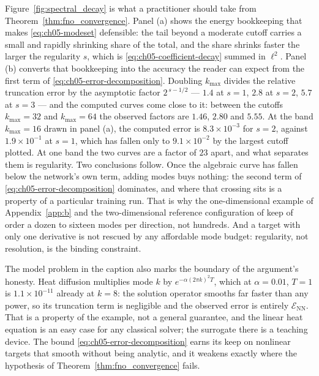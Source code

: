 Figure~\ref{fig:spectral_decay} is what a practitioner should take from
Theorem~\ref{thm:fno_convergence}. Panel (a) shows the energy bookkeeping that
makes \eqref{eq:ch05-modeset} defensible: the tail beyond a moderate cutoff
carries a small and rapidly shrinking share of the total, and the share shrinks
faster the larger the regularity $s$, which is \eqref{eq:ch05-coefficient-decay}
summed in $\ell^2$. Panel (b) converts that bookkeeping into the accuracy the
reader can expect from the first term of \eqref{eq:ch05-error-decomposition}.
Doubling $k_{\max}$ divides the relative truncation error by the asymptotic
factor $2^{\,s-1/2}$ --- $1.4$ at $s=1$, $2.8$ at $s=2$, $5.7$ at $s=3$ --- and
the computed curves come close to it: between the cutoffs $k_{\max} = 32$ and
$k_{\max} = 64$ the observed factors are $1.46$, $2.80$ and $5.55$. At the band
$k_{\max} = 16$ drawn in panel (a), the computed error is $8.3\times10^{-3}$ for
$s=2$, against $1.9\times10^{-1}$ at $s=1$, which has fallen only to
$9.1\times10^{-2}$ by the largest cutoff plotted. At one band the two curves are a
factor of $23$ apart, and what separates them is regularity. Two conclusions
follow. Once the algebraic curve has fallen below the
network's own term, adding modes buys nothing: the second term of
\eqref{eq:ch05-error-decomposition} dominates, and where that crossing sits is a
property of a particular training run. That is why the
one-dimensional example of Appendix~\ref{app:b} and the two-dimensional
reference configuration of 
keep of order a dozen to sixteen modes per direction, not hundreds. And a
target with only one derivative is not rescued by any affordable mode budget:
regularity, not resolution, is the binding constraint.

The model problem in the caption also marks the boundary of the argument's
honesty. Heat diffusion multiplies mode $k$ by $e^{-\alpha(2\pi k)^2 T}$, which
at $\alpha = 0.01$, $T = 1$ is $1.1\times10^{-11}$ already at $k = 8$: the
solution operator smooths far faster than any power, so its truncation term is
negligible and the observed error is entirely $\mathcal{E}_{\text{NN}}$. That is
a property of the example, not a general guarantee, and the linear heat equation
is an easy case for any classical solver; the surrogate there is a teaching
device. The bound \eqref{eq:ch05-error-decomposition} earns its keep on
nonlinear targets that smooth without being analytic, and it weakens exactly
where the hypothesis of Theorem~\ref{thm:fno_convergence} fails.

